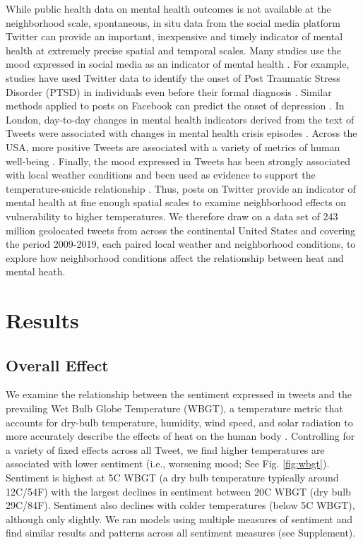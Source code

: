 \documentclass[fleqn,10pt]{wlscirep}
\begin{document}
While public health data on mental health outcomes is not available at the neighborhood scale, spontaneous, in situ data from the social media platform Twitter can provide an important, inexpensive and timely indicator of mental health at extremely precise spatial and temporal scales. Many studies use the mood expressed in social media as an indicator of mental health \cite{Edo-Osagie2020Jul, Sinnenberg2016Dec}. For example, studies have used Twitter data to identify the onset of Post Traumatic Stress Disorder (PTSD) in individuals even before their formal diagnosis \cite{Reece2017Oct}. Similar methods applied to posts on Facebook can predict the onset of depression \cite{Eichstaedt2018Oct}. In London, day-to-day changes in mental health indicators derived from the text of Tweets were associated with changes in mental health crisis episodes \cite{Kolliakou2020Feb}. Across the USA, more positive Tweets are associated with a variety of metrics of human well-being \cite{Mitchell2013May}. Finally, the mood expressed in Tweets has been strongly associated with local weather conditions \cite{baylis_weather_2018, hannak_tweetin_2012} and been used as evidence to support the temperature-suicide relationship \cite{Burke2018Aug}. Thus, posts on Twitter provide an indicator of mental health at fine enough spatial scales to examine neighborhood effects on vulnerability to higher temperatures. We therefore draw on a data set of 243 million geolocated tweets from across the continental United States and covering the period 2009-2019, each paired local weather and neighborhood conditions, to explore how neighborhood conditions affect the relationship between heat and mental heath.

\section*{Results}

\subsection*{Overall Effect}
We examine the relationship between the sentiment expressed in tweets and the prevailing Wet Bulb Globe Temperature (WBGT), a temperature metric that accounts for dry-bulb temperature, humidity, wind speed, and solar radiation to more accurately describe the effects of heat on the human body \cite{budd2008wet}. Controlling for a variety of fixed effects across all Tweet, we find higher temperatures are associated with lower sentiment (i.e., worsening mood; See Fig. \ref{fig:wbgt}).  Sentiment is highest at 5\textdegree C WBGT (a dry bulb temperature typically around 12\textdegree C/54\textdegree F) with the largest declines in sentiment between 20\textdegree C WBGT (dry bulb 29\textdegree C/84\textdegree F). Sentiment also declines with colder temperatures (below 5\textdegree C WBGT), although only slightly. We ran models using multiple measures of sentiment and find similar results and patterns across all sentiment measures (see Supplement).
\end{document}
